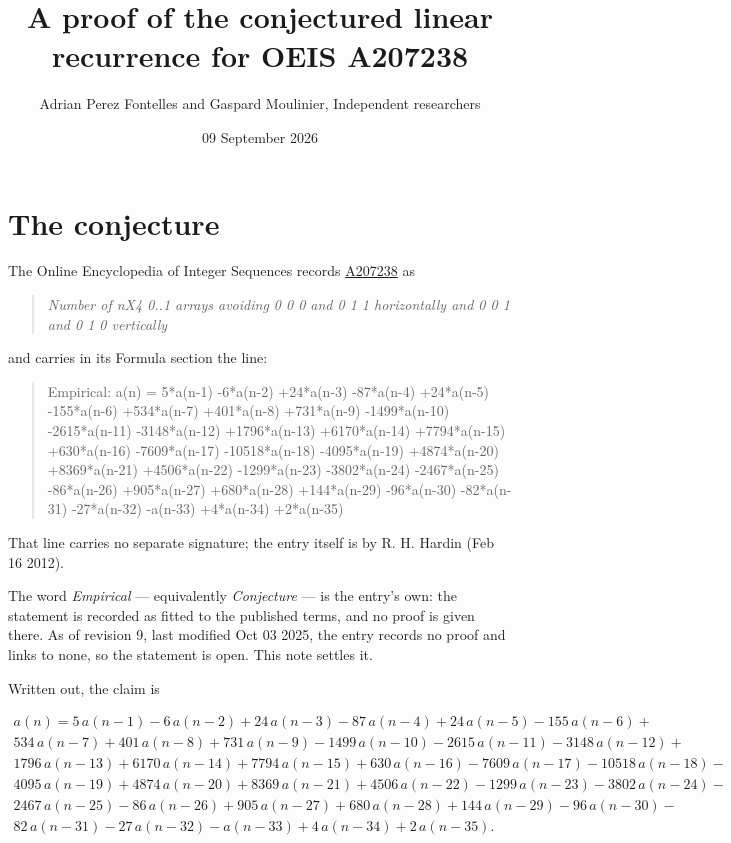 \documentclass[11pt]{article}
\title{A proof of the conjectured linear recurrence for OEIS A207238}
\author{Adrian Perez Fontelles and Gaspard Moulinier, Independent researchers}
\date{09 September 2026}
\theoremstyle{definition}
\begin{document}
\maketitle
\section{The conjecture}

The Online Encyclopedia of Integer Sequences records \href{https://oeis.org/A207238}{A207238} as

\begin{quote}\itshape Number of nX4 0..1 arrays avoiding 0 0 0 and 0 1 1 horizontally and 0 0 1 and 0 1 0 vertically\end{quote}

and carries in its Formula section the line:

\begin{quote}\ttfamily Empirical: a(n) = 5*a(n-1) -6*a(n-2) +24*a(n-3) -87*a(n-4) +24*a(n-5) -155*a(n-6) +534*a(n-7) +401*a(n-8) +731*a(n-9) -1499*a(n-10) -2615*a(n-11) -3148*a(n-12) +1796*a(n-13) +6170*a(n-14) +7794*a(n-15) +630*a(n-16) -7609*a(n-17) -10518*a(n-18) -4095*a(n-19) +4874*a(n-20) +8369*a(n-21) +4506*a(n-22) -1299*a(n-23) -3802*a(n-24) -2467*a(n-25) -86*a(n-26) +905*a(n-27) +680*a(n-28) +144*a(n-29) -96*a(n-30) -82*a(n-31) -27*a(n-32) -a(n-33) +4*a(n-34) +2*a(n-35)\end{quote}

That line carries no separate signature; the entry itself is by R. H. Hardin (Feb 16 2012).

The word {\itshape Empirical} --- equivalently {\itshape Conjecture} --- is the entry's own: the statement is recorded as fitted to the published terms, and no proof is given there. As of revision 9, last modified Oct 03 2025, the entry records no proof and links to none, so the statement is open. This note settles it.

Written out, the claim is

\begin{multline*} a(n) = 5\,a(n-1) - 6\,a(n-2) + 24\,a(n-3) - 87\,a(n-4) + 24\,a(n-5) - 155\,a(n-6) + \\ 534\,a(n-7) + 401\,a(n-8) + 731\,a(n-9) - 1499\,a(n-10) - 2615\,a(n-11) - 3148\,a(n-12) + \\ 1796\,a(n-13) + 6170\,a(n-14) + 7794\,a(n-15) + 630\,a(n-16) - 7609\,a(n-17) - 10518\,a(n-18) - \\ 4095\,a(n-19) + 4874\,a(n-20) + 8369\,a(n-21) + 4506\,a(n-22) - 1299\,a(n-23) - 3802\,a(n-24) - \\ 2467\,a(n-25) - 86\,a(n-26) + 905\,a(n-27) + 680\,a(n-28) + 144\,a(n-29) - 96\,a(n-30) - \\ 82\,a(n-31) - 27\,a(n-32) - a(n-33) + 4\,a(n-34) + 2\,a(n-35). \end{multline*}
\end{document}
